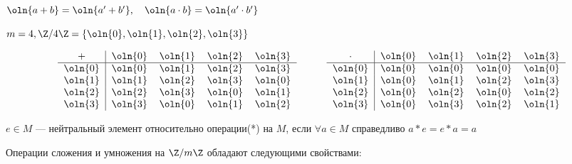 $\oln{a + b} = \oln{a' + b'}, \quad \oln{a \cdot b} = \oln{a' \cdot b'}$

\begin{example}
    $m = 4, \Z/4\Z = \{\oln{0}, \oln{1}, \oln{2}, \oln{3}\}$
\end{example}

\[
\begin{tabular}{c|cccc}
    $+$ & $\oln{0}$ & $\oln{1}$ & $\oln{2}$ & $\oln{3}$\\
    \hline
    $\oln{0}$ & $\oln{0}$ & $\oln{1}$ & $\oln{2}$ & $\oln{3}$\\
    $\oln{1}$ & $\oln{1}$ & $\oln{2}$ & $\oln{3}$ & $\oln{0}$\\
    $\oln{2}$ & $\oln{2}$ & $\oln{3}$ & $\oln{0}$ & $\oln{1}$\\
    $\oln{3}$ & $\oln{3}$ & $\oln{0}$ & $\oln{1}$ & $\oln{2}$
\end{tabular}
\quad\quad\quad
\begin{tabular}{c|cccc}
    $\cdot$ & $\oln{0}$ & $\oln{1}$ & $\oln{2}$ & $\oln{3}$\\
    \hline
    $\oln{0}$ & $\oln{0}$ & $\oln{0}$ & $\oln{0}$ & $\oln{0}$\\
    $\oln{1}$ & $\oln{0}$ & $\oln{1}$ & $\oln{2}$ & $\oln{3}$\\
    $\oln{2}$ & $\oln{0}$ & $\oln{2}$ & $\oln{0}$ & $\oln{2}$\\
    $\oln{3}$ & $\oln{0}$ & $\oln{3}$ & $\oln{2}$ & $\oln{1}$
\end{tabular}
\]

\begin{defn}
    $e \in M$ --- нейтральный элемент относительно операции(*) на $M$, если $\forall a \in M$ справедливо $a * e = e * a = a$
\end{defn}

\begin{theorem-non}
    Операции сложения и умножения на $\Z/m\Z$ обладают следующими свойствами:
\end{theorem-non}

